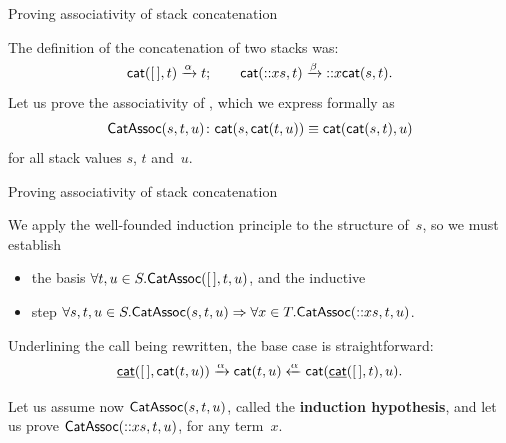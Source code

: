 %
\begin{frame}{Proving associativity of stack concatenation}

The definition of the concatenation of two stacks was:
\begin{equation*}
\textsf{cat}(        [\,],t) \xrightarrow{\smash{\alpha}} t;\qquad
\textsf{cat}(\textsf{::}{x}{s},t) \xrightarrow{\smash{\beta}}
\textsf{::}{x}{\textsf{cat}(s,t)}.
\end{equation*}
Let us prove the associativity of , which we express
formally as
\begin{equation*}
  \textsf{CatAssoc}({s,t,u}) \colon
\textsf{cat}(s,\textsf{cat}(t,u)) \equiv
\textsf{cat}(\textsf{cat}(s,t),u)
\end{equation*}
for all stack values \(s\), \(t\) and~\(u\).

\end{frame}

%
\begin{frame}{Proving associativity of stack concatenation}

  We apply the well\hyp{}founded induction principle to the structure
  of~\(s\), so we must establish
  \begin{itemize}

    \item the basis \(\forall t,u \in S.\textsf{CatAssoc}({[\,],t,u})\),
      and the inductive

    \item step \(\forall s,t,u \in S.\textsf{CatAssoc}({s,t,u})
      \Rightarrow \forall x \in T.\textsf{CatAssoc}({\textsf{::}{x}{s},t,u})\).

  \end{itemize}

  \bigskip

  Underlining the call being rewritten, the base case is
  straightforward:
  \begin{equation*}
    \underline{\textsf{cat}}([\,],\textsf{cat}(t,u))
    \xrightarrow{\smash{\alpha}} \textsf{cat}(t,u)
    \xleftarrow{\smash{\alpha}} \textsf{cat}(\underline{\textsf{cat}}([\,],t),u).
  \end{equation*}

  Let us assume now \(\textsf{CatAssoc}({s,t,u})\), called the
  \textbf{induction hypothesis}, and let us prove
  \(\textsf{CatAssoc}({\textsf{::}{x}{s},t,u})\), for any term~\(x\).

\end{frame}

